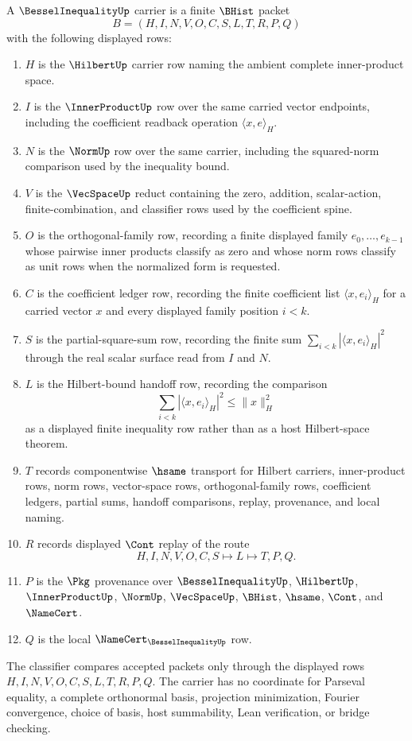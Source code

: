 \begin{definition}
\label{def:bessel-inequality-carrier}
A $\BesselInequalityUp$ carrier is a finite $\BHist$ packet
$$
B=(H,I,N,V,O,C,S,L,T,R,P,Q)
$$
with the following displayed rows:
\begin{enumerate}
\item $H$ is the $\HilbertUp$ carrier row naming the ambient complete inner-product space.
\item $I$ is the $\InnerProductUp$ row over the same carried vector endpoints, including the coefficient readback operation $\langle x,e\rangle_H$.
\item $N$ is the $\NormUp$ row over the same carrier, including the squared-norm comparison used by the inequality bound.
\item $V$ is the $\VecSpaceUp$ reduct containing the zero, addition, scalar-action, finite-combination, and classifier rows used by the coefficient spine.
\item $O$ is the orthogonal-family row, recording a finite displayed family $e_0,\ldots,e_{k-1}$ whose pairwise inner products classify as zero and whose norm rows classify as unit rows when the normalized form is requested.
\item $C$ is the coefficient ledger row, recording the finite coefficient list $\langle x,e_i\rangle_H$ for a carried vector $x$ and every displayed family position $i<k$.
\item $S$ is the partial-square-sum row, recording the finite sum $\sum_{i<k} |\langle x,e_i\rangle_H|^2$ through the real scalar surface read from $I$ and $N$.
\item $L$ is the Hilbert-bound handoff row, recording the comparison
$$
\sum_{i<k} |\langle x,e_i\rangle_H|^2 \leq \|x\|_H^2
$$
as a displayed finite inequality row rather than as a host Hilbert-space theorem.
\item $T$ records componentwise $\hsame$ transport for Hilbert carriers, inner-product rows, norm rows, vector-space rows, orthogonal-family rows, coefficient ledgers, partial sums, handoff comparisons, replay, provenance, and local naming.
\item $R$ records displayed $\Cont$ replay of the route
$$
H,I,N,V,O,C,S \longmapsto L \longmapsto T,P,Q .
$$
\item $P$ is the $\Pkg$ provenance over $\BesselInequalityUp$, $\HilbertUp$, $\InnerProductUp$, $\NormUp$, $\VecSpaceUp$, $\BHist$, $\hsame$, $\Cont$, and $\NameCert$.
\item $Q$ is the local $\NameCert_{\BesselInequalityUp}$ row.
\end{enumerate}
The classifier compares accepted packets only through the displayed rows $H,I,N,V,O,C,S,L,T,R,P,Q$. The carrier has no coordinate for Parseval equality, a complete orthonormal basis, projection minimization, Fourier convergence, choice of basis, host summability, Lean verification, or bridge checking.
\end{definition}

